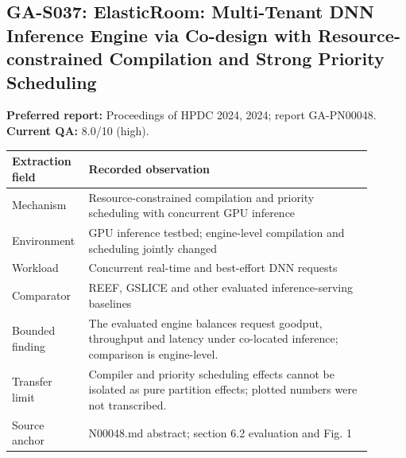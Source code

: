 \subsection{GA-S037: ElasticRoom: Multi-Tenant DNN Inference Engine via Co-design with Resource-constrained Compilation and Strong Priority Scheduling}
\textbf{Preferred report:} Proceedings of HPDC 2024, 2024; report GA-PN00048. \textbf{Current QA:} 8.0/10 (high).
\begin{longtable}{P{0.15\linewidth}P{0.75\linewidth}}
\toprule Extraction field & Recorded observation\\\midrule\endhead
Mechanism & Resource-constrained compilation and priority scheduling with concurrent GPU inference\\
Environment & GPU inference testbed; engine-level compilation and scheduling jointly changed\\
Workload & Concurrent real-time and best-effort DNN requests\\
Comparator & REEF, GSLICE and other evaluated inference-serving baselines\\
Bounded finding & The evaluated engine balances request goodput, throughput and latency under co-located inference; comparison is engine-level.\\
Transfer limit & Compiler and priority scheduling effects cannot be isolated as pure partition effects; plotted numbers were not transcribed.\\
Source anchor & N00048.md abstract; section 6.2 evaluation and Fig. 1\\
\bottomrule\end{longtable}
